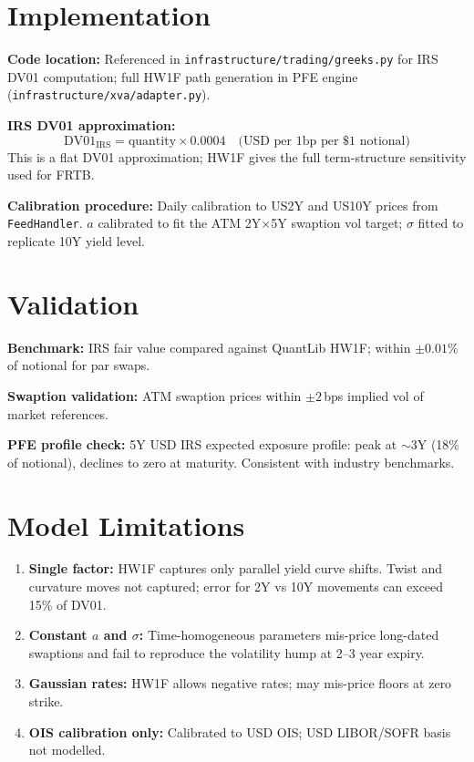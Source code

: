 \documentclass{apex_mdd}
\begin{document}
\section{Implementation}

\textbf{Code location:} Referenced in \texttt{infrastructure/trading/greeks.py} for IRS DV01 computation; full HW1F path generation in PFE engine (\texttt{infrastructure/xva/adapter.py}).

\textbf{IRS DV01 approximation:}
\[
  \mathrm{DV01}_{\mathrm{IRS}} = \text{quantity} \times 0.0004\quad\text{(USD per 1bp per \$1 notional)}
\]
This is a flat DV01 approximation; HW1F gives the full term-structure sensitivity used for FRTB.

\textbf{Calibration procedure:} Daily calibration to US2Y and US10Y prices from \texttt{FeedHandler}. $a$ calibrated to fit the ATM 2Y$\times$5Y swaption vol target; $\sigma$ fitted to replicate 10Y yield level.

\section{Validation}

\textbf{Benchmark:} IRS fair value compared against QuantLib HW1F; within $\pm 0.01\%$ of notional for par swaps.

\textbf{Swaption validation:} ATM swaption prices within $\pm 2$\,bps implied vol of market references.

\textbf{PFE profile check:} 5Y USD IRS expected exposure profile: peak at $\sim$3Y (18\% of notional), declines to zero at maturity. Consistent with industry benchmarks.

\section{Model Limitations}

\begin{enumerate}
  \item \textbf{Single factor:} HW1F captures only parallel yield curve shifts. Twist and curvature moves not captured; error for 2Y vs 10Y movements can exceed 15\% of DV01.
  \item \textbf{Constant $a$ and $\sigma$:} Time-homogeneous parameters mis-price long-dated swaptions and fail to reproduce the volatility hump at 2--3 year expiry.
  \item \textbf{Gaussian rates:} HW1F allows negative rates; may mis-price floors at zero strike.
  \item \textbf{OIS calibration only:} Calibrated to USD OIS; USD LIBOR/SOFR basis not modelled.
\end{enumerate}
\end{document}
